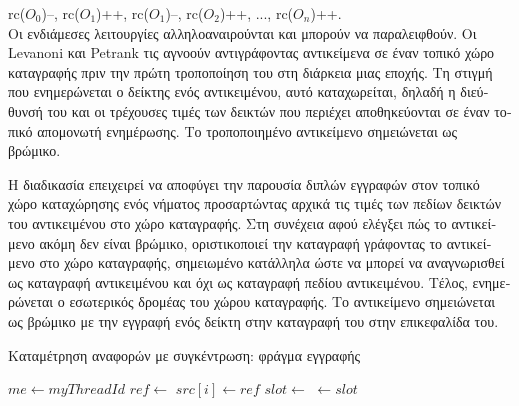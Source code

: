 \begin{greek}
rc($O_0$)--, rc($O_1$)++, rc($O_1$)--, rc($O_2$)++, ..., rc($O_n$)++.\\

Οι ενδιάμεσες λειτουργίες αλληλοαναιρούνται και μπορούν να
παραλειφθούν. Οι Levanoni και Petrank \cite{levanoni1999scalable} 
τις αγνοούν αντιγράφοντας αντικείμενα σε έναν τοπικό χώρο
καταγραφής πριν την πρώτη τροποποίηση του στη διάρκεια μιας
εποχής. Τη στιγμή που ενημερώνεται ο δείκτης ενός αντικειμένου,
αυτό καταχωρείται, δηλαδή η διεύθυνσή του και οι τρέχουσες
τιμές των δεικτών που περιέχει αποθηκεύονται σε έναν τοπικό
απομονωτή ενημέρωσης. Το τροποποιημένο αντικείμενο σημειώνεται
ως βρώμικο.

Η διαδικασία  επειχειρεί να αποφύγει την
παρουσία διπλών εγγραφών στον τοπικό χώρο καταχώρησης ενός
νήματος προσαρτώντας αρχικά τις τιμές των πεδίων δεικτών
του αντικειμένου στο χώρο καταγραφής. Στη συνέχεια αφού
ελέγξει πώς το αντικείμενο ακόμη δεν είναι βρώμικο,
οριστικοποιεί την καταγραφή γράφοντας το αντικείμενο στο
χώρο καταγραφής, σημειωμένο κατάλληλα ώστε να μπορεί να
αναγνωρισθεί ως καταγραφή αντικειμένου και όχι ως καταγραφή
πεδίου αντικειμένου. Τέλος, ενημερώνεται ο εσωτερικός δρομέας
του χώρου καταγραφής. Το αντικείμενο σημειώνεται ως βρώμικο
με την εγγραφή ενός δείκτη στην καταγραφή του στην επικεφαλίδα
του. 

\begin{algorithm}[H]
  \caption{Καταμέτρηση αναφορών με συγκέντρωση: φράγμα εγγραφής}
  \begin{algorithmic}[1]
    \State $me \gets myThreadId$
    \Statex
      \State $ref \gets$ 
        \State {}
      \EndIf
      \State $src[i] \gets ref$
    \EndProcedure
    \Statex
          \State {}
        \EndIf
      \EndFor
        \State $slot \gets$ 
        \State {}
      \EndIf  
    \EndProcedure
    \Statex
      \State {}
    \EndFunction
    \Statex
      \State {} $\gets slot$ 
    \EndProcedure
  \end{algorithmic}
\end{algorithm}


\end{greek}

